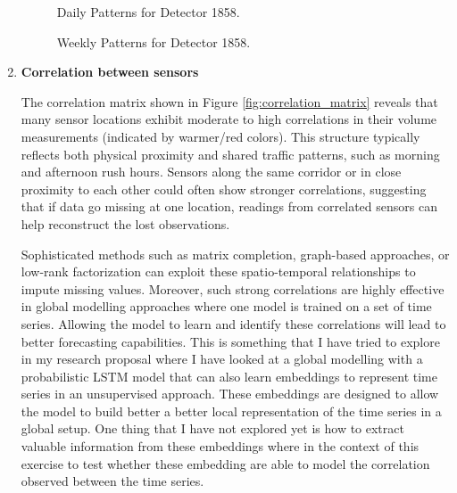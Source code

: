 \documentclass[12pt]{article}
\begin{document}
\begin{enumerate}
\begin{figure}[H]
  \centering
  
  \caption{Daily Patterns for Detector 1858.}
  \label{fig:detector_1858_daily}
\end{figure}

\begin{figure}[H]
  \centering
  
  \caption{Weekly Patterns for Detector 1858.}
  \label{fig:detector_1858_weekly}
\end{figure}

\item{\textbf{Correlation between sensors}}

The correlation matrix shown in Figure \ref{fig:correlation_matrix} reveals that many sensor locations exhibit moderate to high correlations in their volume measurements (indicated by warmer/red colors). This structure typically reflects both physical proximity and shared traffic patterns, such as morning and afternoon rush hours. Sensors along the same corridor or in close proximity to each other could often show stronger correlations, suggesting that if data go missing at one location, readings from correlated sensors can help reconstruct the lost observations. 

Sophisticated methods such as matrix completion, graph-based approaches, or low-rank factorization can exploit these spatio-temporal relationships to impute missing values. Moreover, such strong correlations are highly effective in global modelling approaches where one model is trained on a set of time series. Allowing the model to learn and identify these correlations will lead to better forecasting capabilities. This is something that I have tried to explore in my research proposal where I have looked at a global modelling with a probabilistic LSTM model that can also learn embeddings to represent time series in an unsupervised approach. These embeddings are designed to allow the model to build better a better local representation of the time series in a global setup. One thing that I have not explored yet is how to extract valuable information from these embeddings where in the context of this exercise to test whether these embedding are able to model the correlation observed between the time series.


\end{enumerate}
\end{document}
